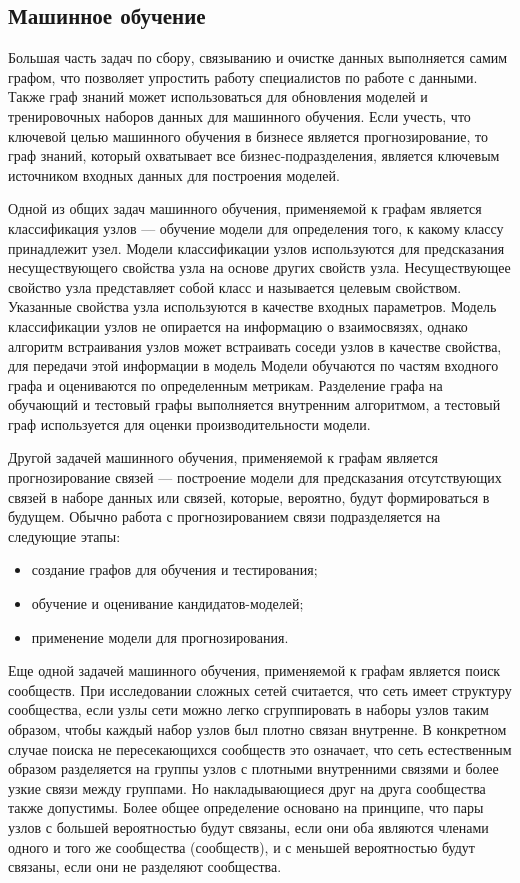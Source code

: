 \subsection{Машинное обучение}

Большая часть задач по сбору, связыванию и очистке данных выполняется самим графом, что позволяет упростить работу специалистов по работе с данными. Также граф знаний может использоваться для обновления моделей и тренировочных наборов данных для машинного обучения. Если учесть, что ключевой целью машинного обучения в бизнесе является прогнозирование, то граф знаний, который охватывает все бизнес-подразделения, является ключевым источником входных данных для построения моделей.

Одной из общих задач машинного обучения, применяемой к графам является классификация узлов — обучение модели для определения того, к какому классу принадлежит узел. Модели классификации узлов используются для предсказания несуществующего свойства узла на основе других свойств узла. Несуществующее свойство узла представляет собой класс и называется целевым свойством. Указанные свойства узла используются в качестве входных параметров. Модель классификации узлов не опирается на информацию о взаимосвязях, однако алгоритм встраивания узлов может встраивать соседи узлов в качестве свойства, для передачи этой информации в модель Модели обучаются по частям входного графа и оцениваются по определенным метрикам. Разделение графа на обучающий и тестовый графы выполняется внутренним алгоритмом, а тестовый граф используется для оценки производительности модели.

Другой задачей машинного обучения, применяемой к графам является прогнозирование связей — построение модели для предсказания отсутствующих связей в наборе данных или связей, которые, вероятно, будут формироваться в будущем. Обычно работа с прогнозированием связи подразделяется на следующие этапы:

\begin{itemize}
    \item создание графов для обучения и тестирования;
    \item обучение и оценивание кандидатов-моделей;
    \item применение модели для прогнозирования.
\end{itemize}

Еще одной задачей машинного обучения, применяемой к графам является поиск сообществ. При исследовании сложных сетей считается, что сеть имеет структуру сообщества, если узлы сети можно легко сгруппировать в наборы узлов таким образом, чтобы каждый набор узлов был плотно связан внутренне. В конкретном случае поиска не пересекающихся сообществ это означает, что сеть естественным образом разделяется на группы узлов с плотными внутренними связями и более узкие связи между группами. Но накладывающиеся друг на друга сообщества также допустимы. Более общее определение основано на принципе, что пары узлов с большей вероятностью будут связаны, если они оба являются членами одного и того же сообщества (сообществ), и с меньшей вероятностью будут связаны, если они не разделяют сообщества.

